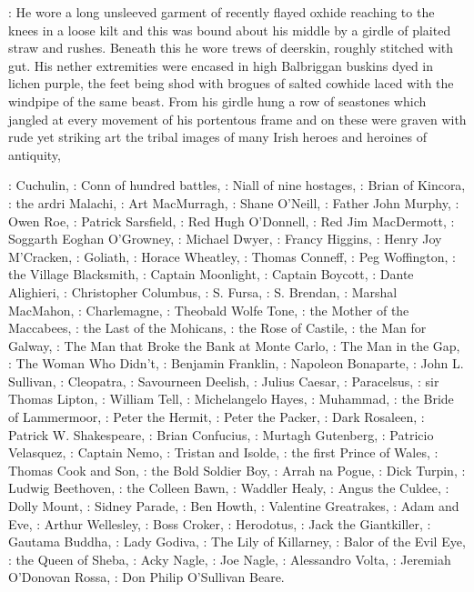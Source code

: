 :
He wore a long unsleeved garment of recently flayed oxhide reaching to the
knees in a loose kilt and this was bound about his middle by a girdle of
plaited straw and rushes. Beneath this he wore trews of deerskin, roughly
stitched with gut. His nether extremities were encased in high Balbriggan
buskins dyed in lichen purple, the feet being shod with brogues of salted
cowhide laced with the windpipe of the same beast. From his girdle hung a
row of seastones which jangled at every movement of his portentous frame
and on these were graven with rude yet striking art the tribal images of
many Irish heroes and heroines of antiquity,

:
Cuchulin,
:
Conn of hundred battles,
:
Niall of nine hostages,
:
Brian of Kincora,
:
the ardri Malachi,
:
Art MacMurragh,
:
Shane O'Neill,
:
Father John Murphy,
:
Owen Roe,
:
Patrick Sarsfield,
:
Red Hugh O'Donnell,
:
Red Jim MacDermott,
:
Soggarth Eoghan O'Growney,
:
Michael Dwyer,
:
Francy Higgins,
:
Henry Joy M'Cracken,
:
Goliath,
:
Horace Wheatley,
:
Thomas Conneff,
:
Peg Woffington,
:
the Village Blacksmith,
:
Captain Moonlight,
:
Captain Boycott,
:
Dante Alighieri,
:
Christopher Columbus,
:
S. Fursa,
:
S. Brendan,
:
Marshal MacMahon,
:
Charlemagne,
:
Theobald Wolfe Tone,
:
the Mother of the Maccabees,
:
the Last of the Mohicans,
:
the Rose of Castile,
:
the Man for Galway,
:
The Man that Broke the Bank at Monte Carlo,
:
The Man in the Gap,
:
The Woman Who Didn't,
:
Benjamin Franklin,
:
Napoleon Bonaparte,
:
John L. Sullivan,
:
Cleopatra,
:
Savourneen Deelish,
:
Julius Caesar,
:
Paracelsus,
:
sir Thomas Lipton,
:
William Tell,
:
Michelangelo Hayes,
:
Muhammad,
:
the Bride of Lammermoor,
:
Peter the Hermit,
:
Peter the Packer,
:
Dark Rosaleen,
:
Patrick W. Shakespeare,
:
Brian Confucius,
:
Murtagh Gutenberg,
:
Patricio Velasquez,
:
Captain Nemo,
:
Tristan and Isolde,
:
the first Prince of Wales,
:
Thomas Cook and Son,
:
the Bold Soldier Boy,
:
Arrah na Pogue,
:
Dick Turpin,
:
Ludwig Beethoven,
:
the Colleen Bawn,
:
Waddler Healy,
:
Angus the Culdee,
:
Dolly Mount,
:
Sidney Parade,
:
Ben Howth,
:
Valentine Greatrakes,
:
Adam and Eve,
:
Arthur Wellesley,
:
Boss Croker,
:
Herodotus,
:
Jack the Giantkiller,
:
Gautama Buddha,
:
Lady Godiva,
:
The Lily of Killarney,
:
Balor of the Evil Eye,
:
the Queen of Sheba,
:
Acky Nagle,
:
Joe Nagle,
:
Alessandro Volta,
:
Jeremiah O'Donovan Rossa,
:
Don Philip O'Sullivan Beare.

